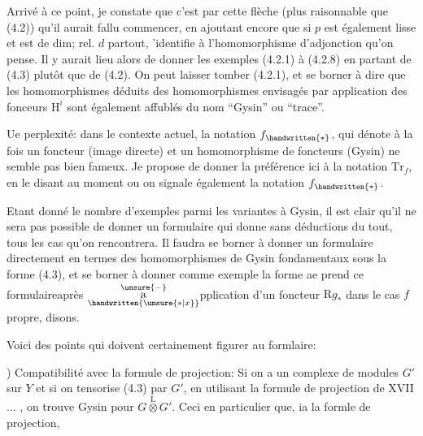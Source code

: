 Arrivé à ce point, je constate que c'est par cette flèche (plus raisonnable que (4.2)) qu'il aurait fallu commencer, en ajoutant encore que si $p$ est également lisse et est de dim; rel. $d$ partout,  'identifie à l'homomorphisme d'adjonction qu'on pense. Il y aurait lieu alors de donner les exemples (4.2.1) à (4.2.8)  en partant de (4.3) plutôt que de (4.2). On peut laisser tomber (4.2.1), et se borner à dire que les homomorphismes déduits des homomorphismes envisagés par application des fonceurs $\mathrm{H}^i$ sont également affublés du nom \unsure{\deleted{(}|(}``Gysin'' ou ``trace''.

Ue perplexité: dans le contexte actuel, la notation $f_{\handwritten{*}}$, qui dénote à la fois un foncteur (image directe) et un homomorphisme de foncteurs (Gysin) ne semble pas bien fameux. Je propose de donner la préférence ici à la notation $\mathrm{Tr}_f$, en le disant au moment ou on signale également la notation $f_{\handwritten{*}}$.

Etant donné le nombre d'exemples parmi les variantes à Gysin, il est clair qu'il ne sera pas possible de donner un formulaire qui donne  sans déductions du tout, tous les cas qu'on rencontrera. Il faudra se borner à donner un formulaire directement en termes des homomorphismes de Gysin fondamentaux sous la forme (4.3), et se borner à donner comme exemple la forme ae prend ce formulaireaprès $\overset{\unsure{-}}{\underset{\handwritten{\unsure{*|x}}}{\mathrm{a}}}$pplication d'un foncteur $\mathrm{R}g_*$ dans le cas $f$ propre, disons.

Voici des points qui doivent certainement figurer au formlaire:

) Compatibilité avec la formule de projection: Si on a un complexe de modules $G'$ sur $Y$ et si on tensorise (4.3) par $G'$, en utilisant la formule de projection de XVII ... , on trouve Gysin pour $G\overset{\mathrm{L}}{\otimes}G'$. Ceci  en particulier que, ia la formle de projection,

